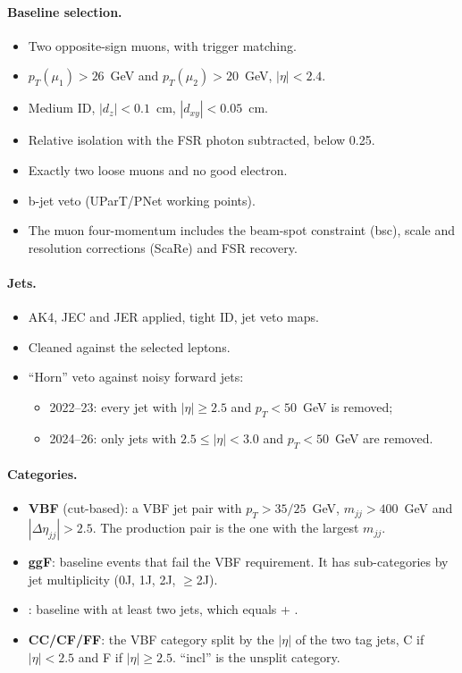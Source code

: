\documentclass[11pt,a4paper]{article}
\begin{document}
\paragraph{Baseline selection.}
\begin{itemize}
  \item Two opposite-sign muons,  with trigger matching.
  \item $p_T(\mu_1) > 26$~GeV and $p_T(\mu_2) > 20$~GeV, $|\eta| < 2.4$.
  \item Medium ID, $|d_z| < 0.1$~cm, $|d_{xy}| < 0.05$~cm.
  \item Relative isolation with the FSR photon subtracted, below 0.25.
  \item Exactly two loose muons and no good electron.
  \item b-jet veto (UParT/PNet working points).
  \item The muon four-momentum includes the beam-spot constraint (bsc),
  scale and resolution corrections (ScaRe) and FSR recovery.
\end{itemize}

\paragraph{Jets.}
\begin{itemize}
  \item AK4, JEC and JER applied, tight ID, jet veto maps.
  \item Cleaned against the selected leptons.
  \item ``Horn'' veto against noisy forward jets:
  \begin{itemize}
    \item 2022--23: every jet with $|\eta| \ge 2.5$ and $p_T < 50$~GeV is removed;
    \item 2024--26: only jets with $2.5 \le |\eta| < 3.0$ and $p_T < 50$~GeV are
    removed.
  \end{itemize}
\end{itemize}

\paragraph{Categories.}
\begin{itemize}
  \item \textbf{VBF} (cut-based): a VBF jet pair with $p_T > 35/25$~GeV,
  $m_{jj} > 400$~GeV and $|\Delta\eta_{jj}| > 2.5$. The production pair is the
  one with the largest $m_{jj}$.
  \item \textbf{ggF}: baseline events that fail the VBF requirement. It has
  sub-categories by jet multiplicity (0J, 1J, 2J, $\ge$2J).
  \item {}: baseline with at least two jets, which equals
   + .
  \item \textbf{CC/CF/FF}: the VBF category split by the $|\eta|$ of the two tag
  jets, C if $|\eta| < 2.5$ and F if $|\eta| \ge 2.5$. ``incl'' is the unsplit
  category.
\end{itemize}
\end{document}

